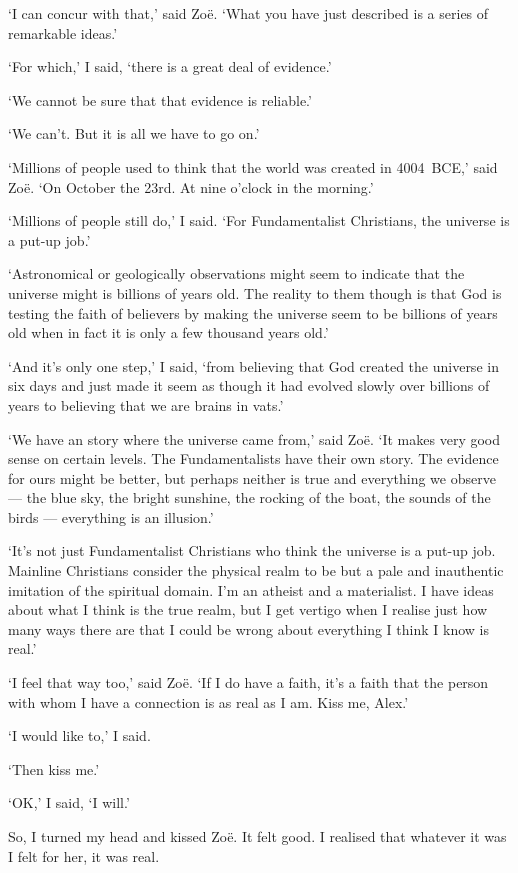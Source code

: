 `I can concur with that,' said Zoë. `What you have just
described is a series of remarkable ideas.'

`For which,' I said, `there is a great deal of evidence.'

`We cannot be sure that that evidence is reliable.'

`We can't. But it is all we have to go on.'

`Millions of people used to think that the world was created in
4004~BCE,' said Zoë. `On October the 23rd. At nine o'clock in
the morning.'

`Millions of people still do,' I said. `For Fundamentalist
Christians, the universe {\twelveit is\/} a put-up job.'

`Astronomical or geologically observations might seem to indicate
that the universe might is billions of years old. The reality to
them though is that God is testing the faith of believers by making
the universe seem to be billions of years old when in fact it is
only a few thousand years old.'

`And it's only one step,' I said, `from believing that God created
the universe in six days and just made it seem as though it had
evolved slowly over billions of years to believing that we are
brains in vats.'

`We have an story where the universe came from,' said Zoë. `It
makes very good sense on certain levels. The Fundamentalists have
their own story. The evidence for ours might be better, but perhaps
neither is true and everything we observe --- the blue sky, the
bright sunshine, the rocking of the boat, the sounds of the birds
--- everything is an illusion.'

`It's not just Fundamentalist Christians who think the universe is a
put-up job. Mainline Christians consider the physical realm to be
but a pale and inauthentic imitation of the spiritual domain. I'm an
atheist and a materialist. I have ideas about what I think is the
true realm, but I get vertigo when I realise just how many ways
there are that I could be wrong about everything I think I know is
real.'

`I feel that way too,' said Zoë. `If I do have a faith, it's a
faith that the person with whom I have a connection is as real as I
am. Kiss me, Alex.'

`I would like to,' I said.

`Then kiss me.'

`OK,' I said, `I will.'

So, I turned my head and kissed Zoë. It felt good. I realised
that whatever it was I felt for her, it was real.

